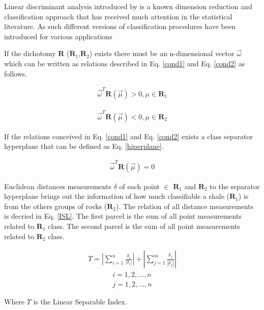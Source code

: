 \documentclass{cilamce19}
\begin{document}
Linear discriminant analysis introduced by \cite{Cover1965} is a known dimension reduction and classification approach that has received much attention in the statistical literature. As such different versions of classification procedures have been introduced for various applications \citep{Okwonu2012}

If the dichotomy $\textbf{R}$ ($\textbf{R}_{1}$,$\textbf{R}_{2}$) exists there must be an n-dimensional vector $\vec{\omega}$ which can be written as relations described in Eq. \ref{cond1} and Eq. \ref{cond2} as follows.

\begin{eqnarray}
\vec{\omega}^{T}\textbf{R}(\vec{\mu}) > 0, \mu \in \textbf{R}_{1}
\label{cond1}
\end{eqnarray}

\begin{eqnarray}
\vec{\omega}^{T}\textbf{R}(\vec{\mu}) < 0, \mu \in \textbf{R}_{2}
\label{cond2}
\end{eqnarray}

If the relations conceived in Eq. \ref{cond1} and Eq. \ref{cond2} exists a class separator hyperplane that can be defined as Eq. \ref{hiperplane}.

\begin{eqnarray}
\vec{\omega}^{T} \textbf{R}(\vec{\mu}) = 0
\label{hiperplane}
\end{eqnarray} 

Euclidean distances measurements $\delta$ of each point $\in$ $\textbf{R}_{1}$ and $\textbf{R}_{2}$ to the separator hyperplane brings out the information of how much classifiable a shale ($\textbf{R}_{1}$) is from the others groups of rocks ($\textbf{R}_{2}$). The relation of all distance measurements  is decried in Eq. \ref{ISL}. The first parcel is the sum of all point measurements related to $\textbf{R}_{1}$ class. The second parcel is the sum of all point measurements related to $\textbf{R}_{2}$ class.

\begin{eqnarray}
\Upsilon =\left|\sum_{i=1}^{n}\frac{\delta_{i}}{|\delta_{i}|}\right| + \left|\sum_{j=1}^{m} \frac{\delta_{j}}{|\delta_{j}|}\right| 
\label{ISL}
\end{eqnarray}
\begin{eqnarray}
i=1,2,...,n \nonumber
\\
j=1,2,...,n \nonumber
\end{eqnarray}

Where $\Upsilon$ is the Linear Separable Index. 
\end{document}

